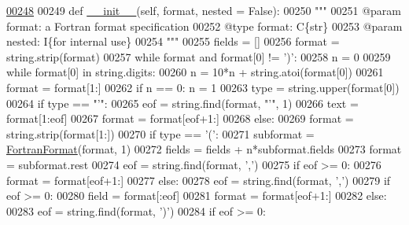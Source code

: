 \begin{DoxyCode}
\hypertarget{classpyneb_1_1utils_1_1_fortran_format_1_1_fortran_format_l00248}{}\hyperlink{classpyneb_1_1utils_1_1_fortran_format_1_1_fortran_format_a7fc0109f1fa73801ad3795463473e41a}{00248} 
00249     \textcolor{keyword}{def }\hyperlink{classpyneb_1_1utils_1_1_fortran_format_1_1_fortran_format_a7fc0109f1fa73801ad3795463473e41a}{\_\_init\_\_}(self, format, nested = False):
00250         \textcolor{stringliteral}{"""}
00251 \textcolor{stringliteral}{        @param format: a Fortran format specification}
00252 \textcolor{stringliteral}{        @type format: C\{str\}}
00253 \textcolor{stringliteral}{        @param nested: I\{for internal use\}}
00254 \textcolor{stringliteral}{        """}
00255         fields = []
00256         format = string.strip(format)
00257         \textcolor{keywordflow}{while} format \textcolor{keywordflow}{and} format[0] != \textcolor{stringliteral}{')'}:
00258             n = 0
00259             \textcolor{keywordflow}{while} format[0] \textcolor{keywordflow}{in} string.digits:
00260                 n = 10*n + string.atoi(format[0])
00261                 format = format[1:]
00262             \textcolor{keywordflow}{if} n == 0: n = 1
00263             type = string.upper(format[0])
00264             \textcolor{keywordflow}{if} type == \textcolor{stringliteral}{"'"}:
00265                 eof = string.find(format, \textcolor{stringliteral}{"'"}, 1)
00266                 text = format[1:eof]
00267                 format = format[eof+1:]
00268             \textcolor{keywordflow}{else}:
00269                 format = string.strip(format[1:])
00270             \textcolor{keywordflow}{if} type == \textcolor{stringliteral}{'('}:
00271                 subformat = \hyperlink{classpyneb_1_1utils_1_1_fortran_format_1_1_fortran_format}{FortranFormat}(format, 1)
00272                 fields = fields + n*subformat.fields
00273                 format = subformat.rest
00274                 eof = string.find(format, \textcolor{stringliteral}{','})
00275                 \textcolor{keywordflow}{if} eof >= 0:
00276                     format = format[eof+1:]
00277             \textcolor{keywordflow}{else}:
00278                 eof = string.find(format, \textcolor{stringliteral}{','})
00279                 \textcolor{keywordflow}{if} eof >= 0:
00280                     field = format[:eof]
00281                     format = format[eof+1:]
00282                 \textcolor{keywordflow}{else}:
00283                     eof = string.find(format, \textcolor{stringliteral}{')'})
00284                     \textcolor{keywordflow}{if} eof >= 0:

\end{DoxyCode}
